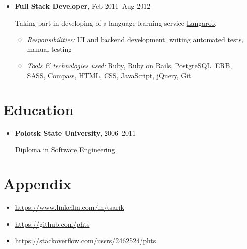 \documentclass[a4paper, 12pt]{article}
\newcommand{\position}[1]{
    \textbf{#1}}
\newcommand{\itemlabel}[1]{
    \textit{#1:}}
\begin{document}
\begin{itemize}
        \item \position{Full Stack Developer}, Feb 2011--Aug 2012

            Taking part in developing of a language learning service \href{http://langaroo.com}{Langaroo}.

            \begin{itemize}
                \item \itemlabel{Responsibilities} UI and backend development, writing automated tests, manual testing
                \item \itemlabel{Tools \& technologies used} Ruby, Ruby on Rails, PostgreSQL, ERB, SASS, Compass, HTML, CSS, JavaScript, jQuery, Git
            \end{itemize}

    \end{itemize}


\section*{Education}

    \begin{itemize}

        \item \position{Polotsk State University}, 2006--2011

            Diploma in Software Engineering.

    \end{itemize}

\section*{Appendix}

    \begin{itemize}
        \item \href{https://www.linkedin.com/in/tsarik}{https://www.linkedin.com/in/tsarik}
        \item \href{https://github.com/phts}{https://github.com/phts}
        \item \href{https://stackoverflow.com/users/2462524/phts}{https://stackoverflow.com/users/2462524/phts}
    \end{itemize}
\end{document}
